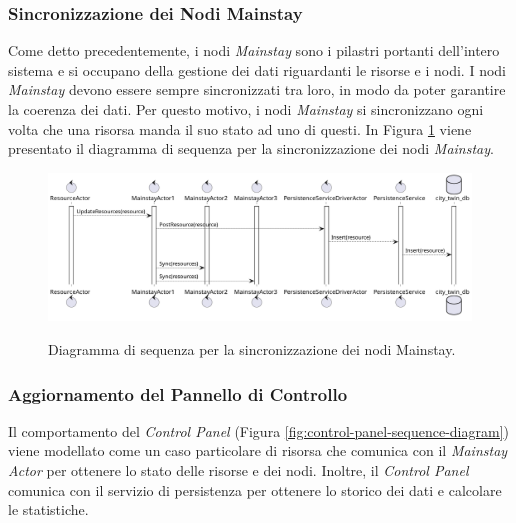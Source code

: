 \documentclass{scrartcl}
\begin{document}
\subsubsection{Sincronizzazione dei Nodi Mainstay}

Come detto precedentemente, i nodi \textit{Mainstay} sono i pilastri portanti dell'intero sistema e si occupano della gestione dei dati riguardanti le risorse e i nodi. I nodi \textit{Mainstay} devono essere sempre sincronizzati tra loro, in modo da poter garantire la coerenza dei dati. Per questo motivo, i nodi \textit{Mainstay} si sincronizzano ogni volta che una risorsa manda il suo stato ad uno di questi. In Figura \ref{fig:core-mainstays-sync-sequence-diagram} viene presentato il diagramma di sequenza per la sincronizzazione dei nodi \textit{Mainstay}.

\begin{figure}[h]
    \caption{Diagramma di sequenza per la sincronizzazione dei nodi Mainstay.}
    \includegraphics[width=\textwidth]{../assets/images/core-mainstays-sync-sequence-diagram.png}
    \label{fig:core-mainstays-sync-sequence-diagram}
\end{figure}

\subsubsection{Aggiornamento del Pannello di Controllo}

Il comportamento del \textit{Control Panel} (Figura \ref{fig:control-panel-sequence-diagram}) viene modellato come un caso particolare di risorsa che comunica con il \textit{Mainstay Actor} per ottenere lo stato delle risorse e dei nodi. Inoltre, il \textit{Control Panel} comunica con il servizio di persistenza per ottenere lo storico dei dati e calcolare le statistiche.
\end{document}
